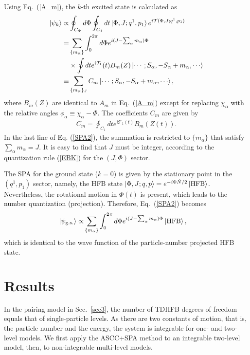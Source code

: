 \documentclass[%
superscriptaddress,
showpacs,
nofootinbib,
amsmath,amssymb,
aps,
prc,
twocolumn,
floatfix ]%
{revtex4-1}
\begin{document}
Using Eq.~(\ref{A_m}),
the $k$-th excited state is calculated as
\begin{align}
\ket{\psi_k} \propto& \oint_{C_\Phi} d\Phi \oint_{C_1} dt
\ket{\Phi,J;q^1,p_1} e^{i\mathcal{T}(\Phi,J;q^1,p_1)}
 \nonumber \\
	=& \sum_{\{m_\alpha\}}
	\int_0^{2\pi} d\Phi e^{i(J-\sum_\alpha m_\alpha)\Phi} \nonumber \\
&\times \oint dt e^{i\mathcal{T}_1}(t) B_m (Z) \ket{\cdots;S_\alpha,-S_\alpha+m_\alpha,\cdots} \nonumber \\
 \equiv& \sum_{\{m_\alpha\}_J} C_m \ket{\cdots;S_\alpha,-S_\alpha+m_\alpha,\cdots},
 \label{SPA2}
\end{align}
where $B_m(Z)$ are identical to $A_m$ in Eq.~(\ref{A_m}) except for
replacing $\chi_\alpha$ with the relative angles
$\phi_\alpha\equiv\chi_\alpha-\Phi$.
The coefficients $C_m$ are given by
\begin{align}
C_m = \oint_{C_1} dt e^{i\mathcal{T}_1(t)} B_m(Z(t)).
  \label{coef}
\end{align}
In the last line of Eq. (\ref{SPA2}), the summation is restricted to
$\{m_\alpha\}$ that satisfy $\sum_\alpha m_\alpha=J$.
It is easy to find that $J$ must be integer,
according to the quantization rule (\ref{EBK}) for the $(J,\Phi)$ sector.

The SPA for the ground state ($k=0$) is given by the stationary point
in the $(q^1,p_1)$ sector,
namely, the HFB state $\ket{\Phi,J;q,p}=e^{-i\Phi\hat{N}/2}\ket{\rm HFB}$.
Nevertheless, the rotational motion in $\Phi(t)$ is present,
which leads to the number quantization (projection).
Therefore, Eq.~(\ref{SPA2}) becomes
\begin{align}
	\ket{\psi_{\rm g.s.}} \propto& \sum_{\{m_\alpha\}}
	\int_0^{2\pi} d\Phi e^{i(J-\sum_\alpha m_\alpha)\Phi}
	\ket{\rm HFB},  
	\label{SPA3}
\end{align}
which is identical to the wave function of the particle-number projected HFB state.


\section{Results}
\label{sec4}

In the pairing model in Sec.~\ref{sec3},
the number of TDHFB degrees of freedom equals that of single-particle levels.
As there are two constants of motion, that is, the particle number and 
the energy, the system is integrable for one- and two-level models.
We first apply the ASCC+SPA method to an integrable two-level model,
then, to non-integrable multi-level models.
\end{document}
